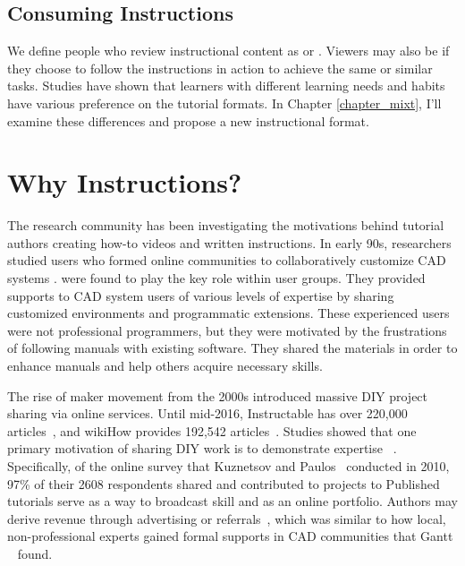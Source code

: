 \subsection{Consuming Instructions}
We define people who review instructional content as  or . Viewers may also be  if they choose to follow the instructions in action to achieve the same or similar tasks.
%
Studies have shown that learners with different learning needs and habits have various preference on the tutorial formats. In Chapter \ref{chapter_mixt}, I'll examine these differences and propose a new instructional format.



\section{Why Instructions?}
\label{background_why}

The research community has been investigating the motivations behind tutorial authors creating how-to videos and written instructions.
%
In early 90s, researchers studied users who formed online communities to collaboratively customize CAD systems \cite{Gantt:1992:GGP:142750.142767}.  were found to play the key role within user groups. They provided supports to CAD system users of various levels of expertise by sharing customized environments and programmatic extensions. These experienced users were not professional programmers, but they were motivated by the frustrations of following manuals with existing software. They shared the materials in order to enhance manuals and help others acquire necessary skills.

The rise of maker movement from the 2000s introduced massive DIY project sharing via online services. Until mid-2016, Instructable has over 220,000 articles~\cite{InstructablesProjects}, and wikiHow provides 192,542 articles~\cite{wikiHowStatistics}.
%
Studies showed that one primary motivation of sharing DIY work is to demonstrate expertise ~\cite{Torrey:2007he,Kuznetsov:2010:REA:1868914.1868950}. Specifically, of the online survey that Kuznetsov and Paulos~\cite{Kuznetsov:2010:REA:1868914.1868950} conducted in 2010, 97\% of their 2608 respondents shared and contributed to projects to  Published tutorials serve as a way to broadcast skill and as an online portfolio.
%
Authors may derive revenue through advertising or referrals~\cite{Lafreniere:2012tl}, which was similar to how local, non-professional experts gained formal supports in CAD communities that Gantt \ea{}~\cite{Gantt:1992:GGP:142750.142767} found.

